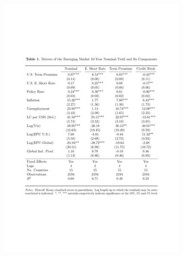 \documentclass[12pt, aspectratio=169, xcolor=dvipsnames]{beamer}  %
\begin{document}
\begin{frame}
\vspace{-0.8cm}
	\begin{figure}[!htbp]
		\begin{center} %
			\includegraphics[trim={2cm 7.1cm 2cm 5cm},clip, width=0.85\textwidth,height=1\textheight]{../Tables/ycdcmp10y.pdf}
			\par\end{center}
	\end{figure}
\end{frame}
\end{document}
